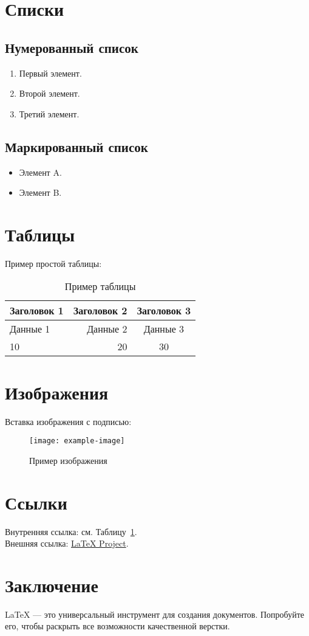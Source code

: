 \documentclass[a4paper,12pt]{article} %
\begin{document}
\section{Списки}

\subsection{Нумерованный список}
\begin{enumerate}
    \item Первый элемент.
    \item Второй элемент.
    \item Третий элемент.
\end{enumerate}

\subsection{Маркированный список}
\begin{itemize}
    \item Элемент A.
    \item Элемент B.
\end{itemize}

\section{Таблицы}

Пример простой таблицы:

\begin{table}[h!]
    \begin{tabular}{l|r|c}
        \hline
        \textbf{Заголовок 1} & \textbf{Заголовок 2} & \textbf{Заголовок 3} \\ \hline
        Данные 1            & Данные 2            & Данные 3            \\ \hline
        10                  & 20                  & 30                  \\ \hline
    \end{tabular}
    \caption{Пример таблицы}
    \label{tab:example}
\end{table}

\section{Изображения}

Вставка изображения с подписью:
\begin{figure}[h!]
    \centering
    \texttt{[image: example-image]} %
    \caption{Пример изображения}
    \label{fig:example}
\end{figure}

\section{Ссылки}

Внутренняя ссылка: см. Таблицу~\ref{tab:example}. \\
Внешняя ссылка: \href{https://www.latex-project.org}{LaTeX Project}.

\section{Заключение}

LaTeX — это универсальный инструмент для создания документов. Попробуйте его, чтобы раскрыть все возможности качественной верстки.
\end{document}
